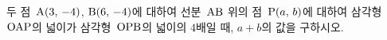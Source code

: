 두 점~$\mathrm{A}(3,\,-4)$, $\mathrm{B}(6,\,-4)$에 대하여 선분~$\mathrm{AB}$ 위의 점~$\mathrm{P}(a,\,b)$에 대하여 삼각형~$\mathrm{OAP}$의 넓이가 삼각형~$\mathrm{OPB}$의 넓이의 $4$배일 때, $a+b$의 값을 구하시오. 
